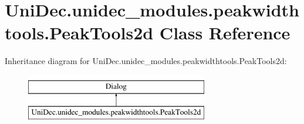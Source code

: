 \hypertarget{class_uni_dec_1_1unidec__modules_1_1peakwidthtools_1_1_peak_tools2d}{}\section{Uni\+Dec.\+unidec\+\_\+modules.\+peakwidthtools.\+Peak\+Tools2d Class Reference}
\label{class_uni_dec_1_1unidec__modules_1_1peakwidthtools_1_1_peak_tools2d}
Inheritance diagram for Uni\+Dec.\+unidec\+\_\+modules.\+peakwidthtools.\+Peak\+Tools2d\+:\begin{figure}[H]
\begin{center}
\leavevmode
\includegraphics[height=2.000000cm]{class_uni_dec_1_1unidec__modules_1_1peakwidthtools_1_1_peak_tools2d}
\end{center}
\end{figure}
